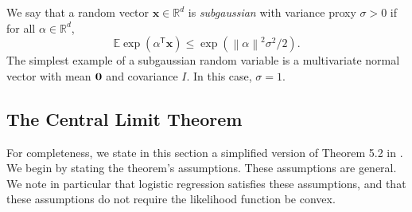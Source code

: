 \documentclass[twoside]{article}
\newcommand{\zero}{\text{\textbf{0}}}
\newcommand{\E}{\mathbb{E}}
\newcommand{\x}{\mathbf{x}}
\newcommand{\normal}[2]{\ensuremath{\mathcal{N}\left({{#1}},{{#2}}\right)}}
\newcommand{\trans}[1]{\ensuremath{{#1}^{\mathsf{T}}}}
\newcommand{\ltwo}[1]{{\left\lVert {#1} \right\rVert}}
\newcommand{\prob}[1]{\Pr\left[{#1}\right]}
\begin{document}

We say that a random vector $\x\in\mathbb{R}^d$ is \emph{subgaussian} with variance proxy $\sigma>0$ if for all $\alpha\in\mathbb{R}^d$,
\begin{equation}
\E\exp(\trans\alpha\x) \le \exp(\ltwo{\alpha}^2\sigma^2/2)
.
\end{equation}
The simplest example of a subgaussian random variable is a multivariate normal vector with mean $\zero$ and covariance $I$.
In this case, $\sigma=1$.

\subsection{The Central Limit Theorem}

For completeness,
we state in this section a simplified version of Theorem 5.2 in \cite{spokoiny2012parametricestimation}.
We begin by stating the theorem's assumptions.
These assumptions are general.
We note in particular that logistic regression satisfies these assumptions,
and that these assumptions do not require the likelihood function be convex.
\end{document}
